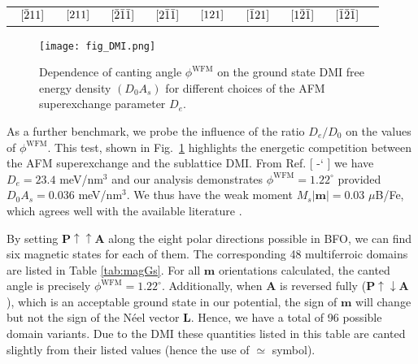 \documentclass[%
 reprint,
superscriptaddress,
 amsmath,amssymb,
prb,
]{revtex4-1}
\newcommand*{\citen}[1]{%
  \begingroup
    \romannumeral-`\x %
    \setcitestyle{numbers}%
    \cite{#1}%
  \endgroup   
}
\begin{document}
\begin{table}[h!]
\begin{ruledtabular}
\begin{tabular}{c c c c c c c c c c c c c c c c c}
 & $\hspace{-5pt}[\bar{2}11]$ & & $\hspace{-5pt}[211]$ &  & $\hspace{-5pt}[\bar{2}\bar{1}\bar{1}]$ & & $\hspace{-5pt}[2\bar{1}\bar{1}]$ & & $\hspace{-5pt}[121]$ & & $\hspace{-5pt}[\bar{1}21]$ & & $\hspace{-5pt}[1\bar{2}\bar{1}]$ &  & $\hspace{-5pt}[\bar{1}\bar{2}\bar{1}]$\\
\end{tabular}
\end{ruledtabular}
\end{table}


\begin{figure}[h!]
\texttt{[image: fig\_DMI.png]}%
\caption{\label{fig:2phi} Dependence of canting angle $\phi^\mathrm{WFM}$ on the ground state DMI free energy density $(D_0 A_s)$ for different choices of the AFM superexchange parameter $D_e$.}
\end{figure}
%

%
As a further benchmark, we probe the influence of the ratio $D_e/D_0$ on the values of $\phi^\mathrm{WFM}$.
%
This test, shown in Fig.~\ref{fig:2phi} highlights the energetic competition between the AFM superexchange and the sublattice DMI.
%
%
From Ref. [\citen{Xu2019}] we have $D_e = 23.4$ meV/nm${}^3$ and our analysis demonstrates $\phi^\mathrm{WFM} = 1.22^\circ$ provided $D_0 A_s = 0.036$ meV/nm${}^3$.
%
We thus have the weak moment $M_s |\mathbf{m}| = 0.03$ $\mu$B/Fe, which agrees well with the available literature \cite{Wojdel2010, Tokunaga2010, Dixit2015, Xu2019}.
%

%
By setting $\mathbf{P}\uparrow\uparrow\mathbf{A}$ along the eight polar directions possible in BFO, we can find six magnetic states for each of them.
%
The corresponding 48 multiferroic domains are listed in Table \ref{tab:magGs}.
%
For all $\mathbf{m}$ orientations calculated, the canted angle is precisely $\phi^\mathrm{WFM} = 1.22^\circ$.
%
%
Additionally, when $\mathbf{A}$ is reversed fully ($\mathbf{P}\uparrow\downarrow\mathbf{A}$), which is an acceptable ground state in our potential, the sign of $\mathbf{m}$ will change but not the sign of the Néel vector $\mathbf{L}$. Hence, we have a total of 96 possible domain variants. Due to the DMI these quantities listed in this table are canted slightly from their listed values (hence the use of $\simeq$ symbol).
%
%
\end{document}
